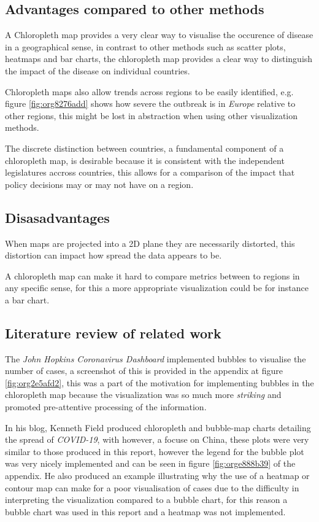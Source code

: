 \documentclass[11pt]{article}
\begin{document}
\subsection{Advantages compared to other methods}
\label{sec:orgab47f26}
A Chloropleth map provides a very clear way to visualise the occurence of
disease in a geographical sense, in contrast to other methods such as scatter
plots, heatmaps and bar charts, the chloropleth map provides a clear way to
distinguish the impact of the disease on individual countries.

Chloropleth maps also allow trends across regions to be easily identified, e.g.
figure \ref{fig:org8276add} shows how severe the outbreak is in \emph{Europe} relative to other
regions, this might be lost in abstraction when using other visualization methods.

The discrete distinction between countries, a fundamental component of a
chloropleth map, is desirable because it is consistent with the independent
legislatures accross countries, this allows for a comparison of the impact
that policy decisions may or may not have on a region.

\subsection{Disasadvantages}
\label{sec:org659d7a5}
When maps are projected into a 2D plane they are necessarily distorted, this
distortion can impact how spread the data appears to be.

A chloropleth map can make it hard to compare metrics between to regions in any
specific sense, for this a more appropriate visualization could be for instance a bar chart.
\subsection{Literature review of related work}
\label{sec:org4a86e6b}
The \emph{John Hopkins Coronavirus Dashboard}  \cite{2020o} implemented bubbles to
visualise the number of cases, a screenshot of this is provided in the appendix
at figure \ref{fig:org2e5afd2}, this was a part of the motivation for implementing bubbles in
the chloropleth map because the visualization was so much more \emph{striking} and
promoted pre-attentive processing of the information.

\label{org8f1cfd9} In his blog, Kenneth Field produced chloropleth and bubble-map charts
detailing the spread of \emph{COVID-19}, with however, a focuse on China, \cite{field2020} these
plots were very similar to those produced in this report, however the legend for
the bubble plot was very nicely implemented and can be seen in figure \ref{fig:orge888b39} of
the appendix. He also produced an example illustrating why the use of a heatmap
or contour map can make for a poor visualisation of cases due to the difficulty
in interpreting the visualization compared to a bubble chart, for this reason a
bubble chart was used in this report and a heatmap was not implemented.
\end{document}
